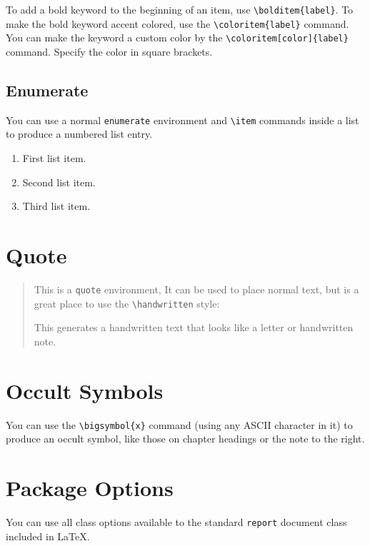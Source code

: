 \documentclass[english]{vaesen-supplement}
\begin{document}
\begin{itemize}
     To add a bold keyword to the beginning of an item, use \verb|\bolditem{label}|.
     To make the bold keyword accent colored, use the \verb|\coloritem{label}| command.
      You can make the keyword a custom color by the \verb|\coloritem[color]{label}| command. Specify the color in square brackets.
\end{itemize}

\subsection{Enumerate}
You can use a normal \verb|enumerate| environment and \verb|\item| commands inside a list to produce a numbered list entry.

\begin{enumerate}
    \item First list item.
    \item Second list item.
    \item Third list item.
\end{enumerate}

\section{Quote}
\begin{quote}
    This is a \verb|quote| environment, It can be used to place normal text, but is a great place to use the \verb|\handwritten| style:
    
    \handwritten This generates a handwritten text that looks like a letter or handwritten note.
\end{quote}


\section{Occult Symbols}
You can use the \verb|\bigsymbol{x}| command (using any ASCII character in it) to produce an occult symbol, like those on chapter headings or the note to the right.

\section{Package Options}
You can use all class options available to the standard \texttt{report} document class included in LaTeX.
\end{document}
